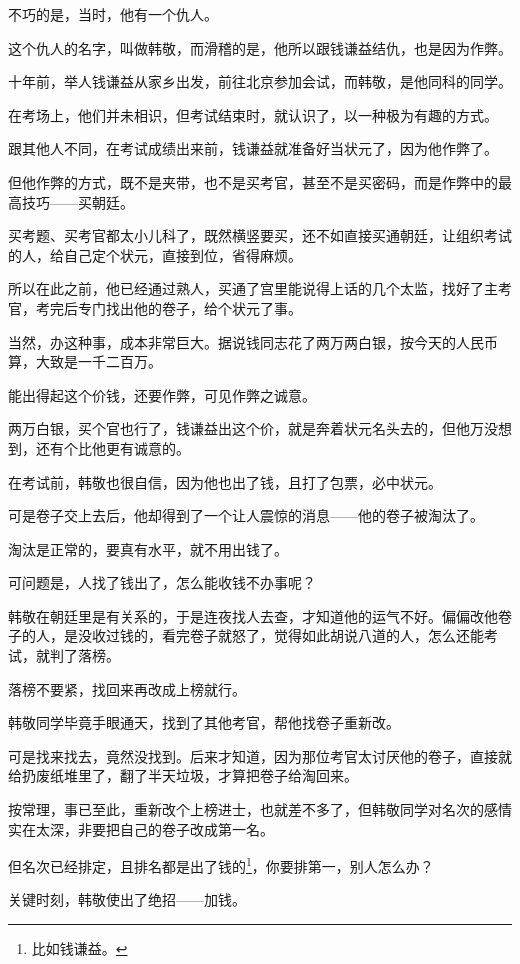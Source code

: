 \begin{multicols}{\theparacolNo}
		不巧的是，当时，他有一个仇人。

		这个仇人的名字，叫做韩敬，而滑稽的是，他所以跟钱谦益结仇，也是因为作弊。

		十年前，举人钱谦益从家乡出发，前往北京参加会试，而韩敬，是他同科的同学。

		在考场上，他们并未相识，但考试结束时，就认识了，以一种极为有趣的方式。

		跟其他人不同，在考试成绩出来前，钱谦益就准备好当状元了，因为他作弊了。

		但他作弊的方式，既不是夹带，也不是买考官，甚至不是买密码，而是作弊中的最高技巧——买朝廷。

		买考题、买考官都太小儿科了，既然横竖要买，还不如直接买通朝廷，让组织考试的人，给自己定个状元，直接到位，省得麻烦。

		所以在此之前，他已经通过熟人，买通了宫里能说得上话的几个太监，找好了主考官，考完后专门找出他的卷子，给个状元了事。

		当然，办这种事，成本非常巨大。据说钱同志花了两万两白银，按今天的人民币算，大致是一千二百万。

		能出得起这个价钱，还要作弊，可见作弊之诚意。

		两万白银，买个官也行了，钱谦益出这个价，就是奔着状元名头去的，但他万没想到，还有个比他更有诚意的。

		在考试前，韩敬也很自信，因为他也出了钱，且打了包票，必中状元。

		可是卷子交上去后，他却得到了一个让人震惊的消息——他的卷子被淘汰了。

		淘汰是正常的，要真有水平，就不用出钱了。

		可问题是，人找了钱出了，怎么能收钱不办事呢？

		韩敬在朝廷里是有关系的，于是连夜找人去查，才知道他的运气不好。偏偏改他卷子的人，是没收过钱的，看完卷子就怒了，觉得如此胡说八道的人，怎么还能考试，就判了落榜。

		落榜不要紧，找回来再改成上榜就行。

		韩敬同学毕竟手眼通天，找到了其他考官，帮他找卷子重新改。

		可是找来找去，竟然没找到。后来才知道，因为那位考官太讨厌他的卷子，直接就给扔废纸堆里了，翻了半天垃圾，才算把卷子给淘回来。

		按常理，事已至此，重新改个上榜进士，也就差不多了，但韩敬同学对名次的感情实在太深，非要把自己的卷子改成第一名。

		但名次已经排定，且排名都是出了钱的\footnote{比如钱谦益。}，你要排第一，别人怎么办？

		关键时刻，韩敬使出了绝招——加钱。


\end{multicols}

